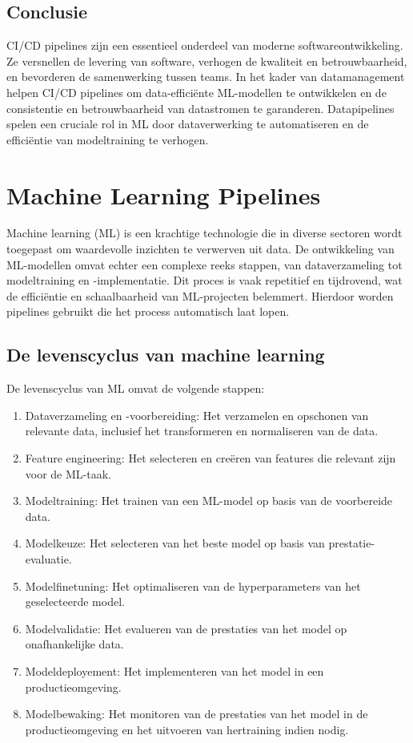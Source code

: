 \subsection{Conclusie}

CI/CD pipelines zijn een essentieel onderdeel van moderne softwareontwikkeling. Ze versnellen de levering van software, verhogen de kwaliteit en betrouwbaarheid, en bevorderen de samenwerking tussen teams. In het kader van datamanagement helpen CI/CD pipelines om data-efficiënte ML-modellen te ontwikkelen en de consistentie en betrouwbaarheid van datastromen te garanderen. Datapipelines spelen een cruciale rol in ML door dataverwerking te automatiseren en de efficiëntie van modeltraining te verhogen.
\section{Machine Learning Pipelines}

Machine learning (ML) is een krachtige technologie die in diverse sectoren wordt toegepast om waardevolle inzichten te verwerven uit data. De ontwikkeling van ML-modellen omvat echter een complexe reeks stappen, van dataverzameling tot modeltraining en -implementatie. Dit proces is vaak repetitief en tijdrovend, wat de efficiëntie en schaalbaarheid van ML-projecten belemmert. Hierdoor worden pipelines gebruikt die het process automatisch laat lopen.

\subsection{De levenscyclus van machine learning}

De levenscyclus van ML omvat de volgende stappen:
\begin{enumerate}[label=\arabic*.]
    \item Dataverzameling en -voorbereiding: Het verzamelen en opschonen van relevante data, inclusief het transformeren en normaliseren van de data.
    \item Feature engineering: Het selecteren en creëren van features die relevant zijn voor de ML-taak.
    \item Modeltraining: Het trainen van een ML-model op basis van de voorbereide data.
    \item Modelkeuze: Het selecteren van het beste model op basis van prestatie-evaluatie.
    \item Modelfinetuning: Het optimaliseren van de hyperparameters van het geselecteerde model.
    \item Modelvalidatie: Het evalueren van de prestaties van het model op onafhankelijke data.
    \item Modeldeployement: Het implementeren van het model in een productieomgeving.
    \item Modelbewaking: Het monitoren van de prestaties van het model in de productieomgeving en het uitvoeren van hertraining indien nodig.
\end{enumerate}

